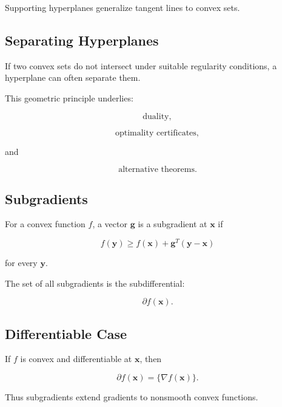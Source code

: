 Supporting hyperplanes generalize tangent lines to convex sets.

\subsection{Separating Hyperplanes}
\label{subsec:separating-hyperplanes}

If two convex sets do not intersect under suitable regularity
conditions, a hyperplane can often separate them.

This geometric principle underlies:

\[
\boxed{
\text{duality},
}
\]

\[
\boxed{
\text{optimality certificates},
}
\]

and

\[
\boxed{
\text{alternative theorems}.
}
\]

\subsection{Subgradients}
\label{subsec:subgradients}

For a convex function \(f\), a vector \(\mathbf{g}\) is a subgradient at
\(\mathbf{x}\) if

\[
\boxed{
f(\mathbf{y})
\geq
f(\mathbf{x})
+
\mathbf{g}^T
(
\mathbf{y}-\mathbf{x}
)
}
\]

for every \(\mathbf{y}\).

The set of all subgradients is the subdifferential:

\[
\boxed{
\partial f(\mathbf{x}).
}
\]

\subsection{Differentiable Case}
\label{subsec:subgradient-differentiable-case}

If \(f\) is convex and differentiable at \(\mathbf{x}\), then

\[
\boxed{
\partial f(\mathbf{x})
=
\{
\nabla f(\mathbf{x})
\}.
}
\]

Thus subgradients extend gradients to nonsmooth convex functions.

